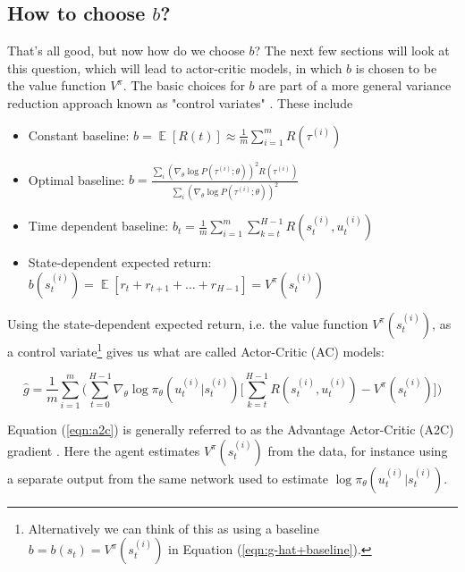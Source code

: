 \documentclass[11pt, oneside]{article}					%
\DeclareMathOperator{\E}{\mathbb{E}}
\begin{document}
\subsection{How to choose $b$?}
\label{seq:choosing_b}
That's all good, but now how do we choose $b$? The next few
sections will look at this question, which will lead to
actor-critic models, in which $b$ is chosen to be the value
function $V^\pi$. The basic choices for $b$ are part of a more
general variance reduction approach known as "control variates"
\cite{Greensmith:2004:VRT:1005332.1044710}. These include

\begin{itemize}
\item Constant baseline: $b = \E [R(t)] \approx \frac{1}{m} \sum\limits_{i = 1}^{m} R(\tau^{(i)})$ \\
\item Optimal baseline: $b = \frac{\sum\limits_i (\nabla_\theta \log P(\tau^{(i)}; \theta))^2 R(\tau^{(i)})}
{\sum\limits_i (\nabla_\theta \log P(\tau^{(i)}; \theta))^2}$
\item Time dependent baseline: $b_t = \frac{1}{m} \sum\limits_{i = 1}^{m} \sum\limits_{k = t}^{H -1} R(s^{(i)}_t, u^{(i)}_t)$
\item State-dependent expected return: $b(s^{(i)}_t) = \E[r_t + r_{t + 1} + \hdots + r_{H - 1}] = V^{\pi}(s^{(i)}_t)$
\end{itemize}

\bigskip
\noindent
Using the state-dependent expected return, i.e. the value
function $V^\pi(s^{(i)}_t)$, as a control
variate\footnote{Alternatively we can think of this as using a
baseline $b = b(s_t) = V^{\pi}(s^{(i)}_t)$ in Equation
(\ref{eqn:g-hat+baseline}).} gives us what are called Actor-Critic
(AC) models:

\bigskip
\begin{equation}
\hat{g} = \frac{1}{m} \sum\limits_{i = 1}^{m} \Bigg ( \sum\limits_{t = 0}^{H - 1} \nabla_{\theta} \log \pi_{\theta} (u^{(i)}_t | s^{(i)}_t) \Bigg [
 \sum\limits_{k = t}^{H - 1} R(s^{(i)}_t, u^{(i)}_t) 
- V^{\pi}(s^{(i)}_t) \Bigg ] \Bigg )
\label{eqn:a2c}
\end{equation}

\bigskip
\noindent
Equation (\ref{eqn:a2c}) is generally referred to as the Advantage
Actor-Critic (A2C) gradient \cite{2018arXiv180302811S}. Here the
agent estimates $V^\pi (s^{(i)}_t)$ from the data, for instance
using a separate output from the same network used to estimate
$\log \pi_{\theta} (u^{(i)}_t | s^{(i)}_t)$.
\end{document}
